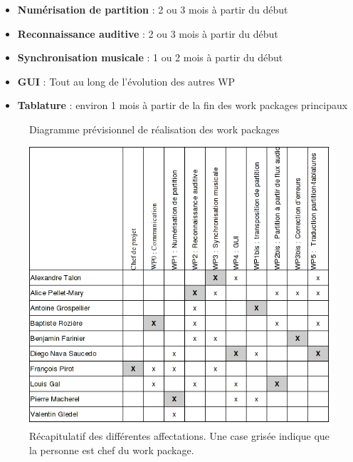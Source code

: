 \documentclass{article}
\begin{document}
\begin{itemize}
\item {\bf Numérisation de partition} : 2 ou 3 mois à partir du début
\item {\bf Reconnaissance auditive} : 2 ou 3 mois à partir du début
\item {\bf Synchronisation musicale} : 1 ou 2 mois à partir du début
\item {\bf GUI} : Tout au long de l'évolution des autres WP
\item {\bf Tablature} : environ 1 mois à partir de la fin des work packages principaux
\end{itemize}
\begin{figure}
\centerline{
}
\caption{Diagramme prévisionnel de réalisation des work packages}
\end{figure}
\begin{figure}
\centerline{
\includegraphics[scale=0.8]{aff}
}
\caption{Récapitulatif des différentes affectations. Une case grisée indique que la personne est chef du work package.}
\end{figure}
\end{document}
